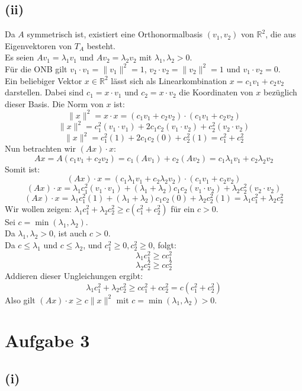 \documentclass{article}
\begin{document}
\subsection*{(ii)}
Da \(A\) symmetrisch ist, existiert eine Orthonormalbasis \((v_1, v_2)\) von \(\mathbb{R}^2\), die aus Eigenvektoren von \(T_A\) besteht. \\
Es seien \(Av_1 = \lambda_1 v_1\) und \(Av_2 = \lambda_2 v_2\) mit \(\lambda_1, \lambda_2 > 0\). \\
Für die ONB gilt \(v_1 \cdot v_1 = \|v_1\|^2 = 1\), \(v_2 \cdot v_2 = \|v_2\|^2 = 1\) und \(v_1 \cdot v_2 = 0\).\\
\newline
Ein beliebiger Vektor \(x \in \mathbb{R}^2\) lässt sich als Linearkombination \(x = c_1 v_1 + c_2 v_2\) darstellen.
Dabei sind \(c_1 = x \cdot v_1\) und \(c_2 = x \cdot v_2\) die Koordinaten von \(x\) bezüglich dieser Basis. 
Die Norm von \(x\) ist:
\[ \|x\|^2 = x \cdot x = (c_1 v_1 + c_2 v_2) \cdot (c_1 v_1 + c_2 v_2) \]
\[ \|x\|^2 = c_1^2 (v_1 \cdot v_1) + 2 c_1 c_2 (v_1 \cdot v_2) + c_2^2 (v_2 \cdot v_2) \]
\[ \|x\|^2 = c_1^2 (1) + 2 c_1 c_2 (0) + c_2^2 (1) = c_1^2 + c_2^2 \]
Nun betrachten wir \((Ax) \cdot x\):
\[ Ax = A(c_1 v_1 + c_2 v_2) = c_1 (Av_1) + c_2 (Av_2) = c_1 \lambda_1 v_1 + c_2 \lambda_2 v_2 \]
Somit ist:
\[ (Ax) \cdot x = (c_1 \lambda_1 v_1 + c_2 \lambda_2 v_2) \cdot (c_1 v_1 + c_2 v_2) \]
\[ (Ax) \cdot x = \lambda_1 c_1^2 (v_1 \cdot v_1) + (\lambda_1 + \lambda_2)c_1 c_2 (v_1 \cdot v_2) + \lambda_2 c_2^2 (v_2 \cdot v_2) \]
\[ (Ax) \cdot x = \lambda_1 c_1^2 (1) + (\lambda_1 + \lambda_2)c_1 c_2 (0) + \lambda_2 c_2^2 (1) = \lambda_1 c_1^2 + \lambda_2 c_2^2 \]
Wir wollen zeigen: \(\lambda_1 c_1^2 + \lambda_2 c_2^2 \ge c (c_1^2 + c_2^2)\) für ein \(c > 0\). \\
Sei \(c = \min(\lambda_1, \lambda_2)\). \\
Da \(\lambda_1, \lambda_2 > 0\), ist auch \(c > 0\). \\
Da \(c \le \lambda_1\) und \(c \le \lambda_2\), und \(c_1^2 \ge 0, c_2^2 \ge 0\), folgt:
\[ \lambda_1 c_1^2 \ge c c_1^2 \]
\[ \lambda_2 c_2^2 \ge c c_2^2 \]
Addieren dieser Ungleichungen ergibt:
\[ \lambda_1 c_1^2 + \lambda_2 c_2^2 \ge c c_1^2 + c c_2^2 = c (c_1^2 + c_2^2) \]
Also gilt \((Ax) \cdot x \ge c \|x\|^2\) mit \(c = \min(\lambda_1, \lambda_2) > 0\).

\section*{Aufgabe 3}
\subsection*{(i)}
\end{document}
